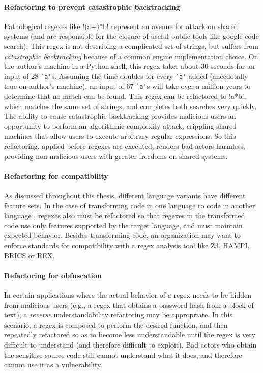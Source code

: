 \paragraph{Refactoring to prevent catastrophic backtracking}  Pathological regexes like \cverb!(a+)*b! represent an avenue for attack on shared systems (and are responsible for the closure of useful public tools like google code search).  This regex is not describing a complicated set of strings, but suffers from \emph{catastrophic backtracking} because of a common engine implementation choice.  On the author's machine in a Python shell, this regex takes about 30 seconds for an input of 28 \verb!`a'!s. Assuming the time doubles for every \verb!`a'! added (anecdotally true on author's machine), an input of 67 \verb!`a'!s will take over a million years to determine that no match can be found.  This regex can be refactored to \cverb!a*b!, which matches the same set of strings, and completes both searches very quickly.  The ability to cause catastrophic backtracking provides malicious users an opportunity to perform an algorithmic complexity attack, crippling shared machines that allow users to execute arbitrary regular expressions.  So this refactoring, applied before regexes are executed, renders bad actors harmless, providing non-malicious users with greater freedoms on shared systems.

\paragraph{Refactoring for compatibility}  As discussed throughout this thesis, different language variants have different feature sets.  In the case of transforming code in one language to code in another language , regexes also must be refactored so that regexes in the transformed code use only features supported by the target language, and must maintain expected behavior.  Besides transforming code, an organization may want to enforce standards for compatibility with a regex analysis tool like Z3, HAMPI, BRICS or REX.

\paragraph{Refactoring for obfuscation}  In certain applications where the actual behavior of a regex needs to be hidden from malicious users (e.g., a regex that obtains a password hash from a block of text), a \emph{reverse} understandability refactoring may be appropriate.  In this scenario, a regex is composed to perform the desired function, and then repeatedly refactored so as to become less understandable until the regex is very difficult to understand (and therefore difficult to exploit).  Bad actors who obtain the sensitive source code still cannot understand what it does, and therefore cannot use it as a vulnerability.

